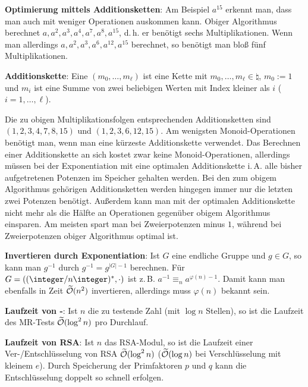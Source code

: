 \linie

\textbf{Optimierung mittels Additionsketten}:
Am Beispiel $a^{15}$ erkennt man, dass man auch mit weniger Operationen auskommen kann.
Obiger Algorithmus berechnet $a, a^2, a^3, a^4, a^7, a^8, a^{15}$, d.\,h. er benötigt
sechs Multiplikationen.
Wenn man allerdings $a, a^2, a^3, a^6, a^{12}, a^{15}$ berechnet, so benötigt man bloß fünf
Multiplikationen.

\textbf{Additionskette}:
Eine  $(m_0, \dotsc, m_\ell)$ ist eine Kette mit
$m_0, \dotsc, m_\ell \in \natural$, $m_0 := 1$ und $m_i$ ist eine Summe von zwei beliebigen
Werten mit Index kleiner als $i$
($i = 1, \dotsc, \ell$).

Die zu obigen Multiplikationsfolgen entsprechenden Additionsketten sind
$(1, 2, 3, 4, 7, 8, 15)$ und $(1, 2, 3, 6, 12, 15)$.
Am wenigsten Monoid-Operationen benötigt man, wenn man eine kürzeste Additionskette verwendet.
Das Berechnen einer Additionskette an sich kostet zwar keine Monoid-Operationen, allerdings
müssen bei der Exponentiation mit eine optimalen Additionskette i.\,A. alle bisher aufgetretenen
Potenzen im Speicher gehalten werden.
Bei den zum obigem Algorithmus gehörigen Additionsketten werden hingegen immer nur die letzten
zwei Potenzen benötigt.
Außerdem kann man mit der optimalen Additionskette nicht mehr als die Hälfte an Operationen
gegenüber obigem Algorithmus einsparen.
Am meisten spart man bei Zweierpotenzen minus $1$,
während bei Zweierpotenzen obiger Algorithmus optimal ist.

\linie

\textbf{Invertieren durch Exponentiation}:
Ist $G$ eine endliche Gruppe und $g \in G$,
so kann man $g^{-1}$ durch $g^{-1} = g^{|G| - 1}$ berechnen.
Für $G = ((\ZnZ)^\ast, \cdot)$ ist z.\,B. $a^{-1} \equiv_n a^{\varphi(n) - 1}$.
Damit kann man ebenfalls in Zeit $\widetilde{\mathcal{O}}(n^2)$ invertieren, allerdings muss $\varphi(n)$ bekannt
sein.

\linie

\textbf{Laufzeit von -}:
Ist $n$ die zu testende Zahl (mit $\log n$ Stellen), so ist die Laufzeit des MR-Tests
$\widetilde{\mathcal{O}}(\log^2 n)$ pro Durchlauf.

\textbf{Laufzeit von RSA}:
Ist $n$ das RSA-Modul, so ist die Laufzeit einer Ver-/Entschlüsselung von RSA
$\widetilde{\mathcal{O}}(\log^2 n)$
($\widetilde{\mathcal{O}}(\log n)$ bei Verschlüsselung mit kleinem $e$).
Durch Speicherung der Primfaktoren $p$ und $q$ kann die Entschlüsselung doppelt so schnell
erfolgen.

\pagebreak
